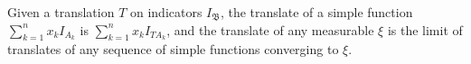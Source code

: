 Given a translation $T$ on indicators $I_{\mathfrak{B}}$, the translate of a simple function $\sum_{k=1}^n x_k I_{A_k}$ is $\sum_{k=1}^n x_k I_{TA_k}$, and the translate of any measurable $\xi$ is the limit of translates of any sequence of simple functions converging to $\xi$.
